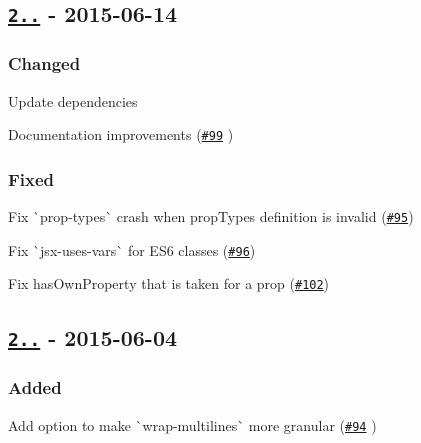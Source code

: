 \subsection*{\href{https://github.com/yannickcr/eslint-plugin-react/compare/v2.5.0...v2.5.1}{\tt 2..} -\/ 2015-\/06-\/14}

\subsubsection*{Changed}


\begin{DoxyItemize}
\item Update dependencies
\item Documentation improvements (\href{https://github.com/yannickcr/eslint-plugin-react/pull/99}{\tt \#99} )
\end{DoxyItemize}

\subsubsection*{Fixed}


\begin{DoxyItemize}
\item Fix \`{}prop-\/types\`{} crash when prop\+Types definition is invalid (\href{https://github.com/yannickcr/eslint-plugin-react/issues/95}{\tt \#95})
\item Fix \`{}jsx-\/uses-\/vars\`{} for E\+S6 classes (\href{https://github.com/yannickcr/eslint-plugin-react/issues/96}{\tt \#96})
\item Fix has\+Own\+Property that is taken for a prop (\href{https://github.com/yannickcr/eslint-plugin-react/issues/102}{\tt \#102})
\end{DoxyItemize}

\subsection*{\href{https://github.com/yannickcr/eslint-plugin-react/compare/v2.4.0...v2.5.0}{\tt 2..} -\/ 2015-\/06-\/04}

\subsubsection*{Added}


\begin{DoxyItemize}
\item Add option to make \`{}wrap-\/multilines\`{} more granular (\href{https://github.com/yannickcr/eslint-plugin-react/pull/94}{\tt \#94} )
\end{DoxyItemize}

